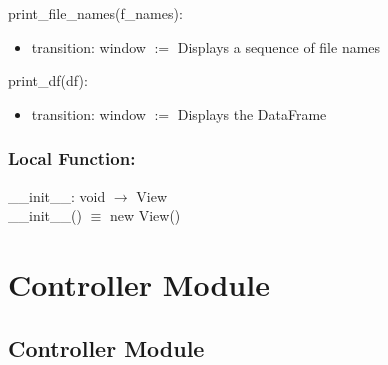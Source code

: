 \documentclass[12pt]{article}
\begin{document}




\noindent print\_file\_names(f\_names):
\begin{itemize}
\item transition: window $:=$ Displays a sequence of file names
\end{itemize}

\noindent print\_df(df):
\begin{itemize}
\item transition: window $:=$ Displays the DataFrame
\end{itemize}

\subsubsection*{Local Function:}

\_\_init\_\_: void $\rightarrow$ View \\
\_\_init\_\_() $\equiv$ new View()

\newpage

\section* {Controller Module}

\subsection* {Controller Module}
\end{document}
